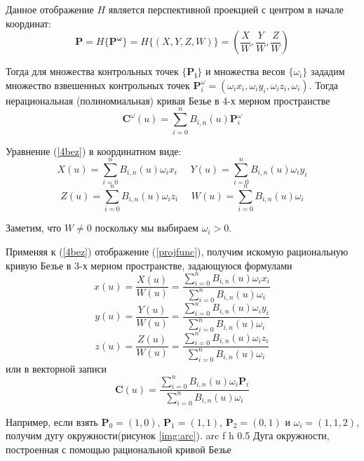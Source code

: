 \documentclass{bmstu}
\begin{document}
Данное отображение $H$ является перспективной проекцией с центром в начале координат:
\begin{equation}\label{projfunc}
    \mathbf{P} = H\{\mathbf{P^\omega}\} = H\{(X, Y, Z, W)\} =
    \left(\frac{X}{W}, \frac{Y}{W}, \frac{Z}{W}\right)
\end{equation}

Тогда для множества контрольных точек $\{\mathbf{P_i}\}$ и множества весов $\{\omega_i\}$ зададим множество взвешенных контрольных точек $\mathbf{P}_i^\omega=(\omega_ix_i,\omega_iy_i,\omega_iz_i, \omega_i)$. Тогда нерациональная (полиномиальная) кривая Безье в 4-х мерном пространстве
\begin{equation}\label{4bez}
    \mathbf{C}^\omega(u) = \sum\limits_{i=0}^nB_{i,n}(u)\mathbf{P}_i^\omega
\end{equation}

Уравнение (\ref{4bez}) в координатном виде:
\begin{equation*}
    X(u) = \sum\limits_{i=0}^nB_{i,n}(u)\omega_ix_i~~~~~~ Y(u) = \sum\limits_{i=0}^nB_{i,n}(u)\omega_iy_i
\end{equation*}
\begin{equation*}
    Z(u) = \sum\limits_{i=0}^nB_{i,n}(u)\omega_iz_i~~~~~~ W(u) = \sum\limits_{i=0}^nB_{i,n}(u)\omega_i
\end{equation*}

Заметим, что $W \neq 0$ поскольку мы выбираем $\omega_i > 0$.

Применяя к (\ref{4bez}) отображение (\ref{projfunc}), получим искомую рациональную кривую Безье в 3-х мерном пространстве, задающуюся формулами
\[
    x(u) = \frac{X(u)}{W(u)}= \frac{\sum\limits_{i=0}^nB_{i,n}(u)\omega_ix_i}{\sum\limits_{i=0}^nB_{i,n}(u)\omega_i}
\]
\[
    y(u) = \frac{Y(u)}{W(u)}= \frac{\sum\limits_{i=0}^nB_{i,n}(u)\omega_iy_i}{\sum\limits_{i=0}^nB_{i,n}(u)\omega_i}
\]
\[
    z(u) = \frac{Z(u)}{W(u)}= \frac{\sum\limits_{i=0}^nB_{i,n}(u)\omega_iz_i}{\sum\limits_{i=0}^nB_{i,n}(u)\omega_i}
\]
или в векторной записи
\begin{equation}\label{ratcurve}
    \mathbf{C}(u) = \frac{\sum\limits_{i=0}^nB_{i,n}(u)\omega_i\mathbf{P}_i}{\sum\limits_{i=0}^nB_{i,n}(u)\omega_i}
\end{equation}



Например, если взять $\mathbf{P}_0 = (1,0)$, $\mathbf{P}_1 = (1,1)$, $\mathbf{P}_2 = (0,1)$ и $\omega_i = (1, 1, 2)$, получим дугу окружности(рисунок \ref{img:arc}).
{arc} %
{f} %
{h} %
{0.5\textwidth} %
{Дуга окружности, построенная с помощью рациональной кривой Безье} %
\end{document}
